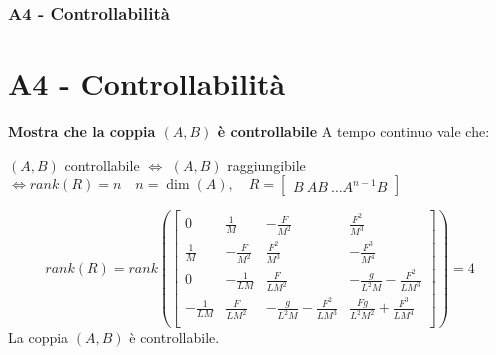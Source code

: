 \documentclass{beamer}
\begin{document}
\begin{frame}
	\frametitle{A4 - Controllabilità}%
	\section{A4 - Controllabilità}%
	\textbf{Mostra che la coppia \((A,B)\) è controllabile}
	A tempo continuo vale che:
	\begin{block}{}
		\((A,B) \) controllabile \(\Longleftrightarrow \) \((A,B) \) raggiungibile  \(\Longleftrightarrow
		rank{(R)}=n \quad n=\dim{(A)},\quad R= \begin{bmatrix}
			B\ AB\ \dots A^{n-1}B
		\end{bmatrix}\)
	\end{block}
	\begin{equation*}
		rank(R)=rank\left(\begin{bmatrix}
			0             & \frac{1}{M}      & -\frac{F}{M^2}                         & \frac{F^{2}}{M^{3}}                        \\
			\frac{1}{M}   & -\frac{F}{M^2}   & \frac{F^{2}}{M^{3}}                    & -\frac{F^{3}}{M^{4}}                       \\
			0             & -\frac{1}{LM}    & \frac{F}{LM^{2}}                       & -\frac{g}{L^{2}M}-\frac{F^{2}}{LM^{3}}     \\
			-\frac{1}{LM} & \frac{F}{LM^{2}} & -\frac{g}{L^{2}M}-\frac{F^{2}}{LM^{3}} & \frac{Fg}{L^{2}M^{2}}+\frac{F^{3}}{LM^{4}} \\
		\end{bmatrix}\right)=4
	\end{equation*}
	La coppia \((A,B) \) è controllabile.
\end{frame}
\end{document}
